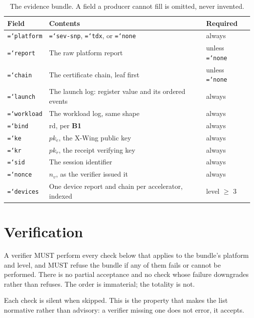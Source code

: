 \documentclass[11pt,a4paper]{article}
\newcommand{\code}[1]{\texttt{\hyphenchar\font=`\-\relax #1}}
\newcommand{\req}[1]{\textbf{#1}}
\begin{document}
\begin{table}[ht]
\centering
\small
\begin{tabular}{@{}lL{0.56\textwidth}l@{}}
\toprule
Field & Contents & Required \\
\midrule
\code{platform} & \code{sev-snp}, \code{tdx}, or \code{none} & always \\
\code{report} & The raw platform report & unless \code{none} \\
\code{chain} & The certificate chain, leaf first & unless \code{none} \\
\code{launch} & The launch log: register value and its ordered events & always \\
\code{workload} & The workload log, same shape & always \\
\code{bind} & $\mathrm{rd}$, per \req{B1} & always \\
\code{ke} & $pk_e$, the X-Wing public key & always \\
\code{kr} & $pk_r$, the receipt verifying key & always \\
\code{sid} & The session identifier & always \\
\code{nonce} & $n_v$, as the verifier issued it & always \\
\code{devices} & One device report and chain per accelerator, indexed & level $\geq$ 3 \\
\bottomrule
\end{tabular}
\caption{The evidence bundle. A field a producer cannot fill is omitted, never
invented.}
\label{tab:bundle}
\end{table}

\section{Verification}
\label{sec:verify}

\begin{description}[leftmargin=1.6em]
\item[\req{V0}] A verifier MUST perform every check below that applies to the
bundle's platform and level, and MUST refuse the bundle if any of them fails or
cannot be performed. There is no partial acceptance and no check whose failure
downgrades rather than refuses. The order is immaterial; the totality is not.
\end{description}

Each check is silent when skipped. This is the property that makes the list
normative rather than advisory: a verifier missing one does not error, it accepts.
\end{document}
